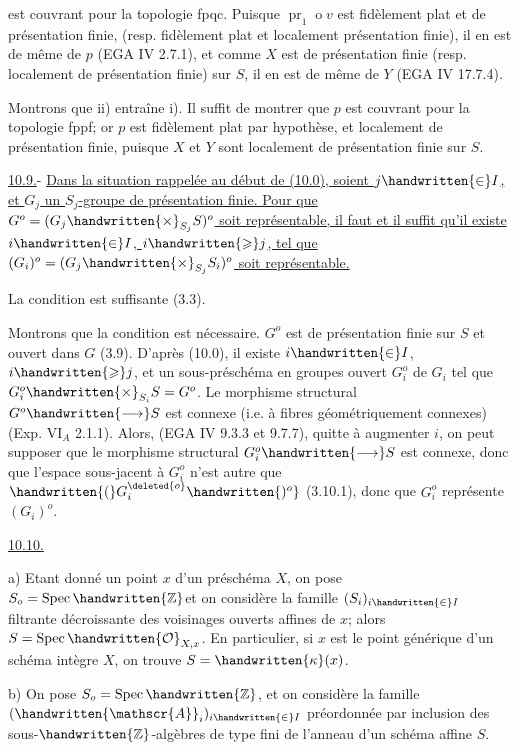 est couvrant pour la topologie fpqc. Puisque $\operatorname{pr}_1\mathbin{o} v$ est fidèlement plat et de présentation finie, (resp. fidèlement plat et localement  présentation finie), il en est de même de $p$ (EGA IV 2.7.1), et comme $X$ est de présentation finie (resp. localement de présentation finie) sur $S$, il en est de même de $Y$ (EGA IV 17.7.4).

Montrons que ii) entraîne i). Il suffit de montrer que $p$ est couvrant pour la topologie fppf; or $p$ est fidèlement plat par hypothèse, et localement de présentation finie, puisque $X$ et $Y$ sont localement de présentation finie sur $S$.

\uline{10.9.}- \uline{Dans la situation rappelée au début de (10.0), soient $j\handwritten{\in}I$, et $G_j$ un $S_j$-groupe de présentation finie. Pour que $G^o=(G_j\handwritten{\times}_{S_j}S)^o$ soit représentable, il faut et il suffit qu'il existe  $i\handwritten{\in}I$, $i\handwritten{\geqslant}j$, tel que $(G_i)^o=(G_j\handwritten{\times}_{S_j}S_i)^o$ soit représentable.}

La condition est suffisante (3.3).

Montrons que la condition est nécessaire.  $G^o$ est de présentation finie sur $S$ et ouvert dans $G$ (3.9). D'après (10.0), il existe $i\handwritten{\in}I$, $i\handwritten{\geqslant}j$, et un sous-préschéma en groupes ouvert $G_i^o$ de $G_i$ tel que $G_i^o\handwritten{\times}_{S_i}S=G^o$. Le morphisme structural $G^o\handwritten{\longrightarrow}S$ est connexe (i.e. à fibres géométriquement connexes)(Exp. $\mathrm{VI}_A$ 2.1.1). Alors, (EGA IV 9.3.3 et 9.7.7), quitte à augmenter $i$, on peut supposer que le morphisme structural $G_i^o\handwritten{\longrightarrow}S$ est connexe, donc que l'espace sous-jacent à $G_i^o$ n'est autre que \uline{$\handwritten{(}G_i^{\deleted{o}}\handwritten{)^o}$} (3.10.1), donc que $G_i^o$ représente $(G_i)^o$.

\uline{10.10.} 

a) Etant donné un point $x$ d'un préschéma $X$, on pose $S_o=\operatorname{Spec}\handwritten{\mathbb{Z}}$\handwritten{/}et on considère la famille $(S_i)_{i\handwritten{\in}I}$ filtrante décroissante des voisinages  ouverts affines de $x$; alors $S=\operatorname{Spec}\handwritten{\mathcal{O}}_{X,x}$. En particulier, si $x$ est le point générique d'un schéma intègre $X$, on trouve $S=\handwritten{\kappa}(x)$.

b) On pose $S_o=\operatorname{Spec}\handwritten{\mathbb{Z}}$, et on considère la famille $(\handwritten{\mathscr{A}}_i)_{i\handwritten{\in}I}$ préordonnée par inclusion des sous-$\handwritten{\mathbb{Z}}$-algèbres de type fini de l'anneau d'un schéma affine $S$.
